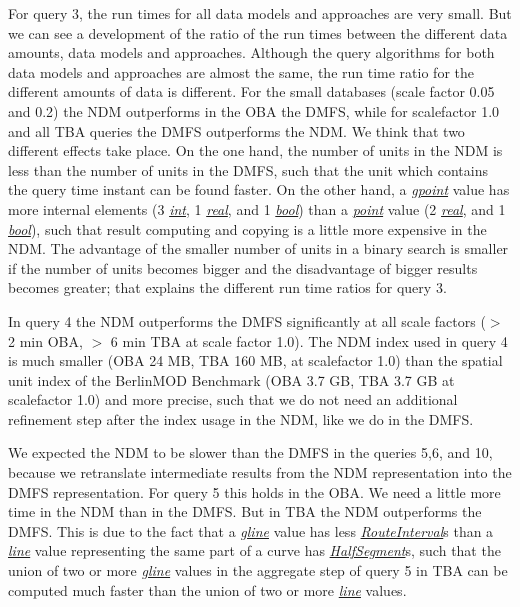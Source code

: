 \documentclass[a4paper]{article}
\newcommand{\bmodb} {BerlinMOD Benchmark}
\newcommand{\dt}[1]{\textsl{\underline{#1}}}
\begin{document}
{For query 3, the run times for all data models and approaches are very small. But
we can see a development of the ratio of the run times between the different
data amounts, data models and approaches. Although the query algorithms for both
data models and approaches are almost the same, the run time ratio for the different
amounts of data is different. For the small databases (scale factor 0.05 and 0.2)
the NDM outperforms in the OBA the DMFS, while for scalefactor 1.0 and all TBA
queries the DMFS outperforms the NDM. We think that
two different effects take place. On the one hand, the number of units in the NDM
is less than the number of units in the DMFS,
such that the unit which contains the query time instant can be found faster.
On the other hand, a \dt{gpoint} value has more internal elements (3 \dt{int}, 1 \dt{real},
and 1 \dt{bool}) than a \dt{point} value (2 \dt{real}, and 1 \dt{bool}), such
that result computing and copying is a little more expensive in the NDM.
The advantage of the smaller number of units in a binary search is smaller if
the number of units becomes bigger and the disadvantage of bigger results becomes
greater; that explains the different run time ratios for query 3.

In query 4 the NDM outperforms the DMFS
significantly at all scale factors ($>$ 2 min OBA, $>$ 6 min TBA at scale factor 1.0).
The NDM index used in query 4 is much smaller (OBA 24 MB, TBA 160 MB, at scalefactor 1.0)
than the spatial unit index of the \bmodb{} (OBA 3.7 GB, TBA 3.7 GB at scalefactor 1.0)
and more precise, such that we do not need an additional refinement step after the
index usage in the NDM, like we do in the DMFS.

We expected the NDM to be slower than the DMFS in the queries 5,6, and 10, because
we retranslate intermediate results from the NDM representation into the DMFS representation.
For query 5 this holds in the OBA. We need a little more time in the NDM
than in the DMFS. But in TBA the NDM outperforms the DMFS. This is due to the fact
that a \dt{gline} value has less \dt{RouteInterval}s
than a \dt{line} value representing the same part of a curve has \dt{HalfSegment}s,
such that the union of two or more \dt{gline} values in the aggregate step of query 5 in
TBA can be computed much faster than the union of two or more \dt{line} values.

}
\end{document}
